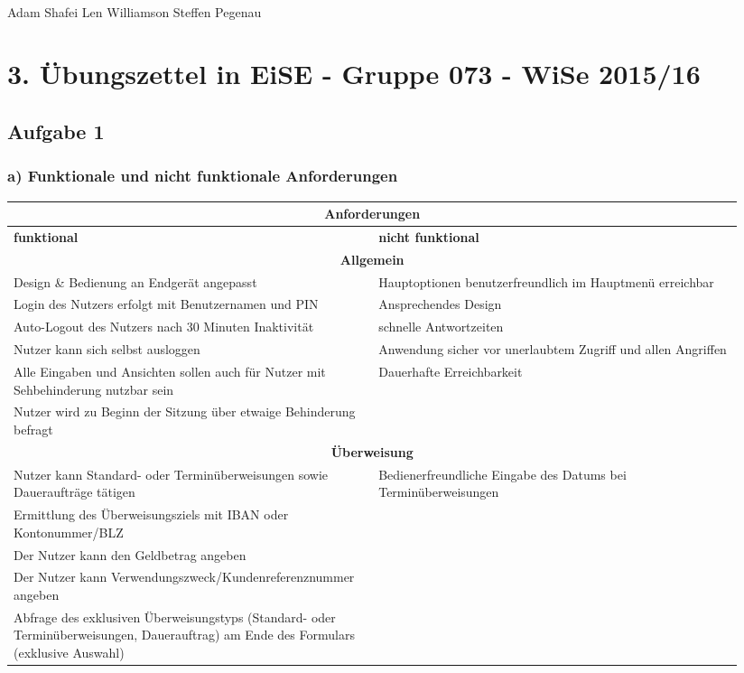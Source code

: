 \documentclass[a4paper,10pt]{article}
\begin{document}
\hfill \\
Adam Shafei \hfill Len Williamson \hfill Steffen Pegenau
\section*{3. Übungszettel in EiSE \-- Gruppe 073 \-- WiSe 2015/16}
\subsection*{Aufgabe 1}
\subsubsection*{a) Funktionale und nicht funktionale Anforderungen}
\begin{longtable}{|p{0.47\linewidth}|p{0.47\linewidth}|}
\hline
\multicolumn{2}{|c|}{\textbf{Anforderungen}} \\
\hline
\textbf{funktional} & \textbf{nicht funktional} \\
\hline
\hline
\multicolumn{2}{|c|}{\textbf{Allgemein}} \\
\hline
Design \& Bedienung an Endgerät angepasst & Hauptoptionen benutzerfreundlich im Hauptmenü erreichbar \\
\hline
Login des Nutzers erfolgt mit Benutzernamen und PIN & Ansprechendes Design \\
\hline
Auto-Logout des Nutzers nach 30 Minuten Inaktivität & schnelle Antwortzeiten \\
\hline
Nutzer kann sich selbst ausloggen & Anwendung sicher vor unerlaubtem Zugriff und allen Angriffen\\
\hline
Alle Eingaben und Ansichten sollen auch für Nutzer mit Sehbehinderung nutzbar sein & Dauerhafte Erreichbarkeit \\
\hline
Nutzer wird zu Beginn der Sitzung über etwaige Behinderung befragt & \\
\hline
\hline
\multicolumn{2}{|c|}{\textbf{Überweisung}} \\
\hline
Nutzer kann Standard- oder Terminüberweisungen sowie Daueraufträge tätigen & Bedienerfreundliche Eingabe des Datums bei Terminüberweisungen \\
\hline
Ermittlung des Überweisungsziels mit IBAN oder Kontonummer/BLZ & \\
\hline
Der Nutzer kann den Geldbetrag angeben & \\
\hline
Der Nutzer kann Verwendungszweck/Kundenreferenznummer angeben & \\
\hline
Abfrage des exklusiven Überweisungstyps (Standard- oder Terminüberweisungen, Dauerauftrag) am Ende des Formulars (exklusive Auswahl) & \\

\end{longtable}
\end{document}
